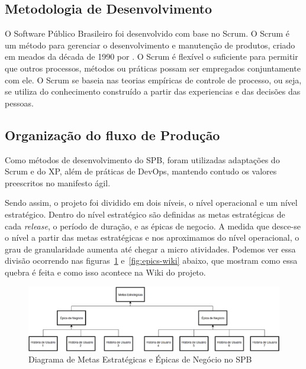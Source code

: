 \subsection{Metodologia de Desenvolvimento}



O Software Público Brasileiro foi desenvolvido com base no Scrum. O
Scrum é um método para gerenciar o desenvolvimento e manutenção de produtos, criado em meados da década de 1990 por . O Scrum é flexível o suficiente para permitir que outros processos, métodos ou práticas possam ser empregados conjuntamente com ele.
O Scrum se baseia nas teorias empíricas de controle de processo, ou seja, se utiliza do conhecimento construído a partir das experiencias e das decisões das pessoas. \cite{Schw01a}

\subsection{Organização do fluxo de Produção}
\label{est:sof:org}

Como métodos de desenvolvimento do SPB, foram utilizadas adaptações do Scrum e do XP, além de práticas de DevOps, mantendo contudo os valores preescritos no manifesto ágil. 

Sendo assim, o projeto foi dividido em dois níveis, o nível operacional e um nível estratégico. Dentro do nível estratégico são definidas
as metas estratégicas de cada \textit{release}, o período de duração, e as épicas de negocio. A medida que desce-se o nível a partir das metas estratégicas e nos aproximamos do nível operacional, o grau de granularidade aumenta até chegar a micro atividades. Podemos ver essa divisão ocorrendo nas figuras~\ref{fig:epics-diagram} e~\ref{fig:epics-wiki} abaixo, que mostram como essa quebra é feita e como isso acontece na Wiki do projeto. 

\newpage
\begin{figure}[h]
    \centering
        \includegraphics[keepaspectratio=true,scale=0.3]{figuras/epics-diagram.eps}
    \caption{Diagrama de Metas Estratégicas e Épicas de Negócio no SPB}
    \label{fig:epics-diagram}
\end{figure}

